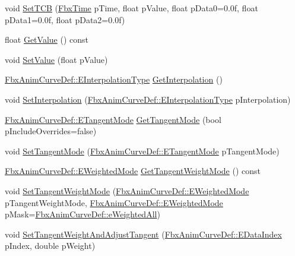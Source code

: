 \begin{DoxyCompactItemize}
\item 
void \hyperlink{class_fbx_anim_curve_key_ace0cb6af3027da5a2ea28ac7e5f528be}{Set\+T\+CB} (\hyperlink{class_fbx_time}{Fbx\+Time} p\+Time, float p\+Value, float p\+Data0=0.\+0f, float p\+Data1=0.\+0f, float p\+Data2=0.\+0f)
\item 
float \hyperlink{class_fbx_anim_curve_key_a7d66374255e912386ab894a5e2945ff5}{Get\+Value} () const
\item 
void \hyperlink{class_fbx_anim_curve_key_a4d7ea46fc9d4a6691c5e6d97569c7ae1}{Set\+Value} (float p\+Value)
\item 
\hyperlink{class_fbx_anim_curve_def_add2ab7d10d856ab0868cc9b143d59ea5}{Fbx\+Anim\+Curve\+Def\+::\+E\+Interpolation\+Type} \hyperlink{class_fbx_anim_curve_key_afe707d042861d5f6d5e22f4811a725ac}{Get\+Interpolation} ()
\item 
void \hyperlink{class_fbx_anim_curve_key_a10777e9392725191bd6ab1d425460406}{Set\+Interpolation} (\hyperlink{class_fbx_anim_curve_def_add2ab7d10d856ab0868cc9b143d59ea5}{Fbx\+Anim\+Curve\+Def\+::\+E\+Interpolation\+Type} p\+Interpolation)
\item 
\hyperlink{class_fbx_anim_curve_def_ac810ccc5ca0527704ab5175479964b87}{Fbx\+Anim\+Curve\+Def\+::\+E\+Tangent\+Mode} \hyperlink{class_fbx_anim_curve_key_a3821c01c7e1b422efcf2fedd074ffb6a}{Get\+Tangent\+Mode} (bool p\+Include\+Overrides=false)
\item 
void \hyperlink{class_fbx_anim_curve_key_a8a8a090694fc042e9b234e40918faf8e}{Set\+Tangent\+Mode} (\hyperlink{class_fbx_anim_curve_def_ac810ccc5ca0527704ab5175479964b87}{Fbx\+Anim\+Curve\+Def\+::\+E\+Tangent\+Mode} p\+Tangent\+Mode)
\item 
\hyperlink{class_fbx_anim_curve_def_aeee6e9cc12501e10dbd3e5caaf66990e}{Fbx\+Anim\+Curve\+Def\+::\+E\+Weighted\+Mode} \hyperlink{class_fbx_anim_curve_key_a6971443814d64229442becc934315c56}{Get\+Tangent\+Weight\+Mode} () const
\item 
void \hyperlink{class_fbx_anim_curve_key_a418159da0643ccdbeb5aa59b69b821e0}{Set\+Tangent\+Weight\+Mode} (\hyperlink{class_fbx_anim_curve_def_aeee6e9cc12501e10dbd3e5caaf66990e}{Fbx\+Anim\+Curve\+Def\+::\+E\+Weighted\+Mode} p\+Tangent\+Weight\+Mode, \hyperlink{class_fbx_anim_curve_def_aeee6e9cc12501e10dbd3e5caaf66990e}{Fbx\+Anim\+Curve\+Def\+::\+E\+Weighted\+Mode} p\+Mask=\hyperlink{class_fbx_anim_curve_def_aeee6e9cc12501e10dbd3e5caaf66990ea4337e6853fab642c2a432ab1bb303922}{Fbx\+Anim\+Curve\+Def\+::e\+Weighted\+All})
\item 
void \hyperlink{class_fbx_anim_curve_key_a9ea49dd21bb571575005dd678ecba501}{Set\+Tangent\+Weight\+And\+Adjust\+Tangent} (\hyperlink{class_fbx_anim_curve_def_a3be261d961f8226235529b148cf80300}{Fbx\+Anim\+Curve\+Def\+::\+E\+Data\+Index} p\+Index, double p\+Weight)

\end{DoxyCompactItemize}
